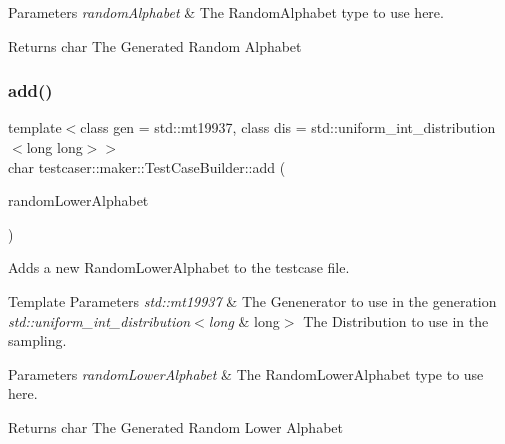 \begin{DoxyParams}{Parameters}
{\em random\+Alphabet} & The Random\+Alphabet type to use here. \\
\hline
\end{DoxyParams}
\begin{DoxyReturn}{Returns}
char The Generated Random Alphabet 
\end{DoxyReturn}
\mbox{\label{classtestcaser_1_1maker_1_1TestCaseBuilder_a0666074618ac122218a4206b5952ca07}} 
\subsubsection{\texorpdfstring{add()}{add()}\hspace{0.1cm}{\footnotesize\ttfamily [2/11]}}
{\footnotesize\ttfamily template$<$class gen  = std\+::mt19937, class dis  = std\+::uniform\+\_\+int\+\_\+distribution$<$long long$>$$>$ \\
char testcaser\+::maker\+::\+Test\+Case\+Builder\+::add (\begin{DoxyParamCaption}\item[{\mbox{\hyperlink{classtestcaser_1_1maker_1_1types_1_1RandomLowerAlphabet}{types\+::\+Random\+Lower\+Alphabet}}$<$ gen, dis $>$ \&}]{random\+Lower\+Alphabet }\end{DoxyParamCaption})\hspace{0.3cm}{\ttfamily [inline]}}



Adds a new Random\+Lower\+Alphabet to the testcase file. 


\begin{DoxyTemplParams}{Template Parameters}
{\em std\+::mt19937} & The Genenerator to use in the generation \\
\hline
{\em std\+::uniform\+\_\+int\+\_\+distribution$<$long} & long$>$ The Distribution to use in the sampling. \\
\hline
\end{DoxyTemplParams}

\begin{DoxyParams}{Parameters}
{\em random\+Lower\+Alphabet} & The Random\+Lower\+Alphabet type to use here. \\
\hline
\end{DoxyParams}
\begin{DoxyReturn}{Returns}
char The Generated Random Lower Alphabet 
\end{DoxyReturn}
\mbox{\label{classtestcaser_1_1maker_1_1TestCaseBuilder_a0d02a42731de8cffd9cc5be67d49290e}} 

